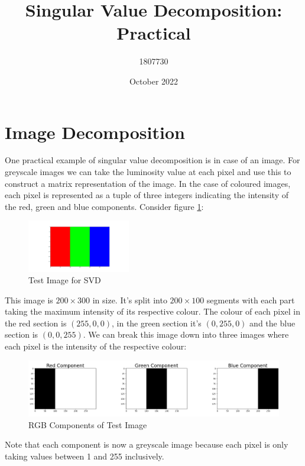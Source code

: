 \documentclass{article}
\title{Singular Value Decomposition: Practical}
\author{1807730}
\date{October 2022}
\begin{document}
	\maketitle
	\newpage
	
	\section{Image Decomposition}
	One practical example of singular value decomposition is in case of an image. For greyscale images we can take the luminosity value at each pixel and use this to construct a matrix representation of the image. In the case of coloured images, each pixel is represented as a tuple of three integers indicating the intensity of the red, green and blue components. Consider figure \ref{fig:test_image}:
	
	\begin{figure}[h]
		\centering
		\includegraphics[width=0.4\textwidth]{test_image_plot.png}
		\caption{Test Image for SVD}
		\label{fig:test_image}
	\end{figure}

	This image is $200 \times 300$ in size. It's split into $200 \times 100$ segments with each part taking the maximum intensity of its respective colour. The colour of each pixel in the red section is $(255, 0, 0)$, in the green section it's $(0, 255, 0)$ and the blue section is $(0, 0, 255)$. We can break this image down into three images where each pixel is the intensity of the respective colour:
	
	\begin{figure}[h]
		\centering
		\includegraphics[scale=0.27]{test_image_rgb_plot.png}
		\caption{RGB Components of Test Image}
		\label{fig:test_image_rgb}
	\end{figure}

	Note that each component is now a greyscale image because each pixel is only taking values between 1 and 255 inclusively. 
	
\end{document}
